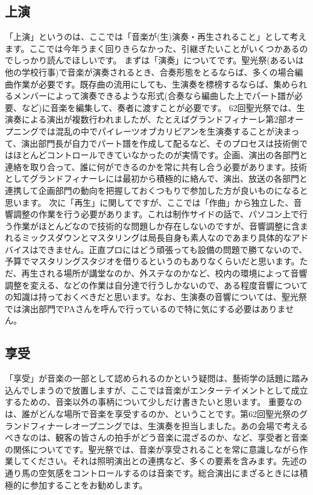 \documentclass[dvipdfmx,jb5]{jarticle}
\begin{document}
\subsection{上演}
「上演」というのは、ここでは「音楽が(生)演奏・再生されること」として考えます。ここでは今年うまく回りきらなかった、引継ぎたいことがいくつかあるのでしっかり読んでほしいです。
まずは「演奏」についてです。聖光祭(あるいは他の学校行事)で音楽が演奏されるとき、合奏形態をとるならば、多くの場合編曲作業が必要です。既存曲の流用にしても、生演奏を標榜するならば、集められるメンバーによって演奏できるような形式(合奏なら編曲した上でパート譜が必要、など)に音楽を編集して、奏者に渡すことが必要です。
62回聖光祭では、生演奏による演出が複数行われましたが、たとえばグランドフィナーレ第2部オープニングでは混乱の中でパイレーツオブカリビアンを生演奏することが決まって、演出部門長が自力でパート譜を作成して配るなど、そのプロセスは技術側ではほとんどコントロールできていなかったのが実情です。企画、演出の各部門と連絡を取り合って、誰に何ができるのかを常に共有し合う必要があります。技術としてグランドフィナーレには最初から積極的に絡んで、演出、放送の各部門と連携して企画部門の動向を把握しておくつもりで参加した方が良いものになると思います。
次に「再生」に関してですが、ここでは「作曲」から独立した、音響調整の作業を行う必要があります。これは制作サイドの話で、パソコン上で行う作業がほとんどなので技術的な問題しか存在しないのですが、音響調整に含まれるミックスダウンとマスタリングは局長自身も素人なのであまり具体的なアドバイスはできません。正直プロにはどう頑張っても設備の問題で勝てないので、予算でマスタリングスタジオを借りるというのもありなくらいだと思います。ただ、再生される場所が講堂なのか、外ステなのかなど、校内の環境によって音響調整を変える、などの作業は自分達で行うしかないので、ある程度音響についての知識は持っておくべきだと思います。なお、生演奏の音響については、聖光祭では演出部門でPAさんを呼んで行っているので特に気にする必要はありません。

\subsection{享受}
「享受」が音楽の一部として認められるのかという疑問は、藝術学の話題に踏み込んでしまうので放置しますが、ここでは音楽がエンターテイメントとして成立するための、音楽以外の事柄について少しだけ書きたいと思います。
重要なのは、誰がどんな場所で音楽を享受するのか、ということです。第62回聖光祭のグランドフィナーレオープニングでは、生演奏を担当しました。あの会場で考えるべきなのは、観客の皆さんの拍手がどう音楽に混ざるのか、など、享受者と音楽の関係についてです。聖光祭では、音楽が享受されることを常に意識しながら作業してください。それは照明演出との連携など、多くの要素を含みます。先述の通り馬の空気感をコントロールするのは音楽です。総合演出にまざるときには積極的に参加することをお勧めします。
\end{document}

